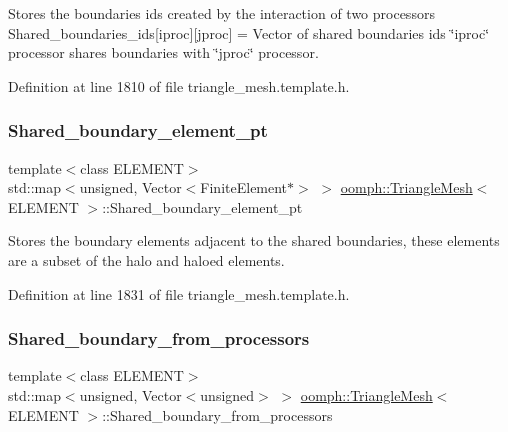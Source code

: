Stores the boundaries ids created by the interaction of two processors Shared\+\_\+boundaries\+\_\+ids\mbox{[}iproc\mbox{]}\mbox{[}jproc\mbox{]} = Vector of shared boundaries ids \char`\"{}iproc\char`\"{} processor shares boundaries with \char`\"{}jproc\char`\"{} processor. 



Definition at line 1810 of file triangle\+\_\+mesh.\+template.\+h.

\mbox{\label{classoomph_1_1TriangleMesh_afa3e46babf3984371ce4da85b110b6fa}} 
\subsubsection{\texorpdfstring{Shared\+\_\+boundary\+\_\+element\+\_\+pt}{Shared\_boundary\_element\_pt}}
{\footnotesize\ttfamily template$<$class E\+L\+E\+M\+E\+NT$>$ \\
std\+::map$<$unsigned, Vector$<$Finite\+Element$\ast$$>$ $>$ \hyperlink{classoomph_1_1TriangleMesh}{oomph\+::\+Triangle\+Mesh}$<$ E\+L\+E\+M\+E\+NT $>$\+::Shared\+\_\+boundary\+\_\+element\+\_\+pt\hspace{0.3cm}{\ttfamily [protected]}}



Stores the boundary elements adjacent to the shared boundaries, these elements are a subset of the halo and haloed elements. 



Definition at line 1831 of file triangle\+\_\+mesh.\+template.\+h.

\mbox{\label{classoomph_1_1TriangleMesh_a48491979123f1e1ca1d669c52e255dc1}} 
\subsubsection{\texorpdfstring{Shared\+\_\+boundary\+\_\+from\+\_\+processors}{Shared\_boundary\_from\_processors}}
{\footnotesize\ttfamily template$<$class E\+L\+E\+M\+E\+NT$>$ \\
std\+::map$<$unsigned, Vector$<$unsigned$>$ $>$ \hyperlink{classoomph_1_1TriangleMesh}{oomph\+::\+Triangle\+Mesh}$<$ E\+L\+E\+M\+E\+NT $>$\+::Shared\+\_\+boundary\+\_\+from\+\_\+processors\hspace{0.3cm}{\ttfamily [protected]}}



